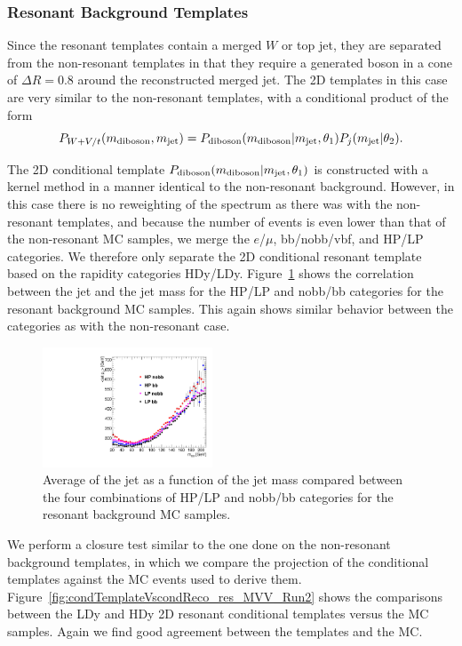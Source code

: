 \subsubsection{Resonant Background Templates}

Since the resonant templates contain a merged $W$ or top jet, they are separated from the non-resonant templates in that they require a generated boson in a cone of $\Delta R=0.8$ around the reconstructed merged jet.
The 2D templates in this case are very similar to the non-resonant templates, with a conditional product of the form
\begin{equation}
  P_{W+V/t}(m_\mathrm{diboson},m_\mathrm{jet})=P_\mathrm{diboson}(m_\mathrm{diboson}|m_\mathrm{jet},\theta_1)P_j(m_\mathrm{jet}|\theta_2).
\end{equation}

The 2D conditional template $P_\mathrm{diboson}(m_\mathrm{diboson}|m_\mathrm{jet},\theta_1)$ is constructed with a kernel method in a manner identical to the non-resonant background.
However, in this case there is no reweighting of the \MVV spectrum as there was with the non-resonant templates, and because the number of events is even lower than that of the non-resonant MC samples, we merge the $e$/$\mu$, bb/nobb/vbf, and HP/LP categories.
We therefore only separate the 2D conditional resonant template based on the rapidity categories HDy/LDy.
Figure~\ref{fig:res2DCorr} shows the correlation between the jet \pt and the jet mass for the HP/LP and nobb/bb categories for the resonant background MC samples.
This again shows similar behavior between the categories as with the non-resonant case.

\begin{figure}[htbp]
  \centering
  \includegraphics[width=0.45\textwidth]{fig/analysis/res_corr.pdf}
  \caption{
    Average \pt of the jet as a function of the jet mass \MJ compared between the four combinations of HP/LP and nobb/bb categories for the resonant background MC samples.
  }
  \label{fig:res2DCorr}
\end{figure}

We perform a closure test similar to the one done on the non-resonant background templates, in which we compare the \MVV projection of the conditional templates against the MC events used to derive them.
Figure~\ref{fig:condTemplateVscondReco_res_MVV_Run2} shows the comparisons between the LDy and HDy 2D resonant conditional templates versus the MC samples.
Again we find good agreement between the templates and the MC.

